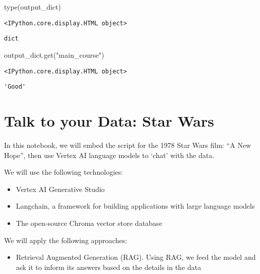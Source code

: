 \documentclass[
  letterpaper,
  DIV=11,
  numbers=noendperiod]{scrreprt}
\newenvironment{Shaded}{\begin{snugshade}}{\end{snugshade}}
\newcommand{\BuiltInTok}[1]{\textcolor[rgb]{0.00,0.23,0.31}{#1}}
\newcommand{\NormalTok}[1]{\textcolor[rgb]{0.00,0.23,0.31}{#1}}
\newcommand{\StringTok}[1]{\textcolor[rgb]{0.13,0.47,0.30}{#1}}
\providecommand{\tightlist}{%
  \setlength{\itemsep}{0pt}\setlength{\parskip}{0pt}}\usepackage{longtable,booktabs,array}
\begin{document}
\begin{Shaded}
\begin{Highlighting}[]
\BuiltInTok{type}\NormalTok{(output\_dict)}
\end{Highlighting}
\end{Shaded}

\begin{verbatim}
<IPython.core.display.HTML object>
\end{verbatim}

\begin{verbatim}
dict
\end{verbatim}

\begin{Shaded}
\begin{Highlighting}[]
\NormalTok{output\_dict.get(}\StringTok{"main\_course"}\NormalTok{)}
\end{Highlighting}
\end{Shaded}

\begin{verbatim}
<IPython.core.display.HTML object>
\end{verbatim}

\begin{verbatim}
'Good'
\end{verbatim}


\hypertarget{talk-to-your-data-star-wars}{%
\chapter{Talk to your Data: Star
Wars}\label{talk-to-your-data-star-wars}}

In this notebook, we will embed the script for the 1978 Star Wars film:
``A New Hope'', then use Vertex AI language models to `chat' with the
data.

We will use the following technologies:

\begin{itemize}
\item
  Vertex AI Generative Studio
\item
  Langchain, a framework for building applications with large language
  models
\item
  The open-source Chroma vector store database
\end{itemize}

We will apply the following approaches:

\begin{itemize}
\tightlist
\item
  Retrieval Augmented Generation (RAG). Using RAG, we feed the model and
  ask it to inform its answers based on the details in the data
\end{itemize}
\end{document}
